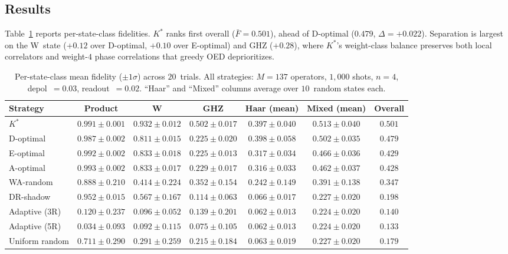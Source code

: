 \documentclass[twocolumn,prx,aps,superscriptaddress,longbibliography]{revtex4-2}
\begin{document}
\subsection{Results}

Table~\ref{tab:sota-full} reports per-state-class fidelities.
$K^*$ ranks first overall ($\bar{F} = 0.501$), ahead of
D-optimal ($0.479$, $\Delta = +0.022$).  Separation is largest
on the W~state ($+0.12$ over D-optimal, $+0.10$ over E-optimal)
and GHZ ($+0.28$), where $K^*$'s weight-class balance preserves
both local correlators and weight-$4$ phase correlations that greedy
OED deprioritizes.

\begin{table}[tb]
\centering
\caption{Per-state-class mean fidelity ($\pm 1\sigma$) across $20$~trials.
All strategies: $M = 137$ operators, $1{,}000$ shots, $n = 4$,
depol~$= 0.03$, readout~$= 0.02$.  ``Haar'' and ``Mixed'' columns
average over $10$~random states each.}
\label{tab:sota-full}
\begin{tabular}{lcccccc}
\toprule
Strategy & Product & W & GHZ & Haar (mean) & Mixed (mean) & Overall \\
\midrule
$K^*$          & $0.991 \pm 0.001$ & $\mathbf{0.932 \pm 0.012}$ & $\mathbf{0.502 \pm 0.017}$ & $0.397 \pm 0.040$ & $\mathbf{0.513 \pm 0.040}$ & $\mathbf{0.501}$ \\
D-optimal      & $0.987 \pm 0.002$ & $0.811 \pm 0.015$ & $0.225 \pm 0.020$ & $\mathbf{0.398 \pm 0.058}$ & $0.502 \pm 0.035$ & $0.479$ \\
E-optimal      & $\mathbf{0.992 \pm 0.002}$ & $0.833 \pm 0.018$ & $0.225 \pm 0.013$ & $0.317 \pm 0.034$ & $0.466 \pm 0.036$ & $0.429$ \\
A-optimal      & $\mathbf{0.993 \pm 0.002}$ & $0.833 \pm 0.017$ & $0.229 \pm 0.017$ & $0.316 \pm 0.033$ & $0.462 \pm 0.037$ & $0.428$ \\
WA-random      & $0.888 \pm 0.210$ & $0.414 \pm 0.224$ & $0.352 \pm 0.154$ & $0.242 \pm 0.149$ & $0.391 \pm 0.138$ & $0.347$ \\
DR-shadow      & $0.952 \pm 0.015$ & $0.567 \pm 0.167$ & $0.114 \pm 0.063$ & $0.066 \pm 0.017$ & $0.227 \pm 0.020$ & $0.198$ \\
Adaptive (3R)  & $0.120 \pm 0.237$ & $0.096 \pm 0.052$ & $0.139 \pm 0.201$ & $0.062 \pm 0.013$ & $0.224 \pm 0.020$ & $0.140$ \\
Adaptive (5R)  & $0.034 \pm 0.093$ & $0.092 \pm 0.115$ & $0.075 \pm 0.105$ & $0.062 \pm 0.013$ & $0.224 \pm 0.020$ & $0.133$ \\
Uniform random & $0.711 \pm 0.290$ & $0.291 \pm 0.259$ & $0.215 \pm 0.184$ & $0.063 \pm 0.019$ & $0.227 \pm 0.020$ & $0.179$ \\
\bottomrule
\end{tabular}
\end{table}
\end{document}
